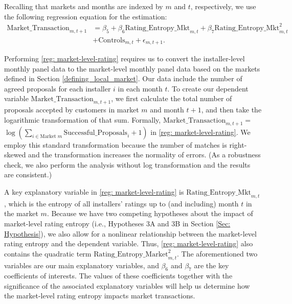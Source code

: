 \documentclass[msom,blindrev]{informs3}
\begin{document}
	
	
	Recalling that markets and months are indexed by $m$ and $t$, respectively, we use the following regression equation for the estimation:
	\begin{align} \nonumber
	\text{Market\_Transaction}_{m,t+1} & =\beta_{5} + \beta_{6} \text{Rating\_Entropy\_Mkt}_{m,t}+ \beta_{7} \text{Rating\_Entropy\_Mkt}_{m,t}^2\\ \label{reg: market-level-rating}
	&+ \text{Controls}_{m,t}  +\epsilon_{m,t+1}.
	\end{align}
	
	Performing \eqref{reg: market-level-rating} requires us to convert the installer-level monthly panel data to the market-level monthly panel data based on the markets defined in Section \ref{defining_local_market}. Our data include the number of agreed proposals for each installer $i$ in each month $t$. To create our dependent variable $\text{Market\_Transaction}_{m,t+1}$, we first calculate the total number of proposals accepted by customers in market $m$ and month $t+1$, and then take the logarithmic transformation of that sum. Formally, $\text{Market\_Transaction}_{m,t+1} =$ $\log\left( \sum_{i \in \text{Market\ } m} \text{Successful\_Proposals}_{i}+ 1 \right)$ in \eqref{reg: market-level-rating}.  We employ this standard transformation because the number of matches is right-skewed and the transformation increases the normality of errors. (As a robustness check, we also perform the analysis without log transformation and the results are consistent.)
	
	A key explanatory variable in \eqref{reg: market-level-rating} is $\text{Rating\_Entropy\_Mkt}_{m,t}$, which is the entropy of all installers' ratings up to (and including) month $t$ in the market $m$.
	Because we have two competing hypotheses about the impact of market-level rating entropy (i.e., Hypotheses 3A and 3B in Section \ref{Sec: Hypothesis}), we also allow for a  nonlinear relationship between the market-level rating entropy and the dependent variable. Thus, \eqref{reg: market-level-rating} also contains the quadratic term  $\text{Rating\_Entropy\_Market}_{m,t}^{2}$. The aforementioned two variables are our main explanatory variables, and $\beta_{6}$ and $\beta_{7}$ are the key coefficients of interests. The values of these coefficients together with the significance of the associated explanatory variables will help us determine how the market-level rating entropy impacts market transactions.
	
\end{document}

